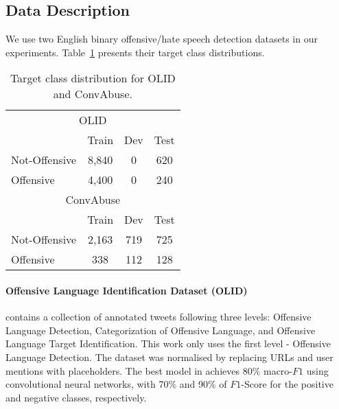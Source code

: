 \documentclass[11pt,a4paper]{article}
\begin{document}
\subsection{Data Description} \label{sec:data-description}
We use two English binary offensive/hate speech detection datasets in our experiments. Table~\ref{tab:datasets-distributions} presents their target class distributions. 

\begin{table}[htb]
\centering
\begin{tabular}{lccc}
\hline
\multicolumn{4}{c}{OLID}                                       \\ 
         & Train           & Dev             & Test            \\ \hline
Not-Offensive & 8,840  & 0               & 620   \\
Offensive & 4,400  & 0             & 240   \\ \hline
\multicolumn{4}{c}{ConvAbuse}                                  \\ 
         & Train           & Dev             & Test            \\ \hline
Not-Offensive & 2,163  & 719   & 725   \\
Offensive & 338   & 112   & 128   \\ \hline
\end{tabular}\caption{\label{tab:datasets-distributions}Target class distribution for OLID and ConvAbuse.}
\end{table}



\paragraph{Offensive Language Identification Dataset (OLID)} \citep{oliddataset} contains a collection of annotated tweets following three levels: Offensive Language Detection, Categorization of Offensive Language, and Offensive Language Target Identification. This work only uses the first level - Offensive Language Detection. The dataset was normalised by replacing URLs and user mentions with placeholders. The best model in \citep{oliddataset} achieves 80\% macro-$F1$ using convolutional neural networks, with 70\% and 90\% of $F1$-Score for the positive and negative classes, respectively.
\end{document}
